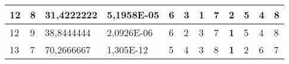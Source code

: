 \documentclass[conference]{IEEEtran}
\begin{document}
\begin{table*}[]
\begin{tabular}{|llll|llllllll|}
\multicolumn{1}{|l|}{12}                                                    & \multicolumn{1}{l|}{8}                                                        & \multicolumn{1}{l|}{31,4222222}                                                   & 5,1958E-05                     & \multicolumn{1}{l|}{6}                                                  & \multicolumn{1}{l|}{3}                                                  & \multicolumn{1}{l|}{\textbf{1}}                                         & \multicolumn{1}{l|}{7}                                                  & \multicolumn{1}{l|}{2}                                                  & \multicolumn{1}{l|}{5}                                                  & \multicolumn{1}{l|}{4}                                                  & 8                          \\ \hline
\multicolumn{1}{|l|}{12}                                                    & \multicolumn{1}{l|}{9}                                                        & \multicolumn{1}{l|}{38,8444444}                                                   & 2,0926E-06                     & \multicolumn{1}{l|}{6}                                                  & \multicolumn{1}{l|}{2}                                                  & \multicolumn{1}{l|}{3}                                                  & \multicolumn{1}{l|}{7}                                                  & \multicolumn{1}{l|}{\textbf{1}}                                         & \multicolumn{1}{l|}{5}                                                  & \multicolumn{1}{l|}{4}                                                  & 8                          \\ \hline
\multicolumn{1}{|l|}{13}                                                    & \multicolumn{1}{l|}{7}                                                        & \multicolumn{1}{l|}{70,2666667}                                                   & 1,305E-12                      & \multicolumn{1}{l|}{5}                                                  & \multicolumn{1}{l|}{4}                                                  & \multicolumn{1}{l|}{3}                                                  & \multicolumn{1}{l|}{8}                                                  & \multicolumn{1}{l|}{\textbf{1}}                                         & \multicolumn{1}{l|}{2}                                                  & \multicolumn{1}{l|}{6}                                                  & 7                          \\ \hline

\end{tabular}
\end{table*}
\end{document}
